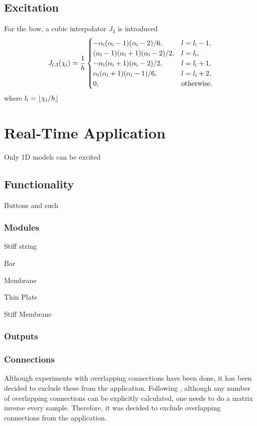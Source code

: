\documentclass{article}
\begin{document}
\subsection{Excitation}
For the bow, a cubic interpolator $J_3$ is introduced
\begin{equation}\label{eq:cubicJ}
    J_{l,3}(\chi_{\text{i}}) = \frac{1}{h}\begin{cases}
        -\alpha_{\text{i}} (\alpha_{\text{i}}-1)(\alpha_{\text{i}}-2)/6, & l = l_{\text{i}}-1,\\
        (\alpha_{\text{i}}-1)(\alpha_{\text{i}}+1)(\alpha_{\text{i}}-2)/2,  & l = l_{\text{i}},\\
        -\alpha_{\text{i}} (\alpha_{\text{i}}+1)(\alpha_{\text{i}}-2)/2, & l = l_{\text{i}} + 1,\\
        \alpha_{\text{i}} (\alpha_{\text{i}}+1)(\alpha_{\text{i}}-1)/6, & l = l_{\text{i}} + 2,\\
        0, & \text{otherwise.}
    \end{cases}
\end{equation}
where $l_\itxt = \floor[\chi_\itxt / h]$
\section{Real-Time Application}
Only 1D models can be excited

\subsection{Functionality}
Buttons and such
\subsubsection{Modules}
Stiff string

Bar

Membrane

Thin Plate

Stiff Membrane

\subsubsection{Outputs}
\subsubsection{Connections}
Although experiments with overlapping connections have been done, it has been decided to exclude these from the application. Following \cite{Bilbao2009Modular}, although any number of overlapping connections can be explicitly calculated, one needs to do a matrix inverse every sample. Therefore, it was decided to exclude overlapping connections from the application. 
\end{document}
